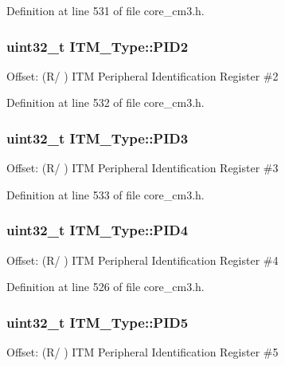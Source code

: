 \-Definition at line 531 of file core\-\_\-cm3.\-h.

\hypertarget{struct_i_t_m___type_ae139d2e588bb382573ffcce3625a88cd}{
\subsubsection[{\-P\-I\-D2}]{ uint32\-\_\-t {\bf \-I\-T\-M\-\_\-\-Type\-::\-P\-I\-D2}}}\label{struct_i_t_m___type_ae139d2e588bb382573ffcce3625a88cd}
\-Offset\-: (\-R/ ) \-I\-T\-M \-Peripheral \-Identification \-Register \#2 

\-Definition at line 532 of file core\-\_\-cm3.\-h.

\hypertarget{struct_i_t_m___type_af006ee26c7e61c9a3712a80ac74a6cf3}{
\subsubsection[{\-P\-I\-D3}]{ uint32\-\_\-t {\bf \-I\-T\-M\-\_\-\-Type\-::\-P\-I\-D3}}}\label{struct_i_t_m___type_af006ee26c7e61c9a3712a80ac74a6cf3}
\-Offset\-: (\-R/ ) \-I\-T\-M \-Peripheral \-Identification \-Register \#3 

\-Definition at line 533 of file core\-\_\-cm3.\-h.

\hypertarget{struct_i_t_m___type_accfc7de00b0eaba0301e8f4553f70512}{
\subsubsection[{\-P\-I\-D4}]{ uint32\-\_\-t {\bf \-I\-T\-M\-\_\-\-Type\-::\-P\-I\-D4}}}\label{struct_i_t_m___type_accfc7de00b0eaba0301e8f4553f70512}
\-Offset\-: (\-R/ ) \-I\-T\-M \-Peripheral \-Identification \-Register \#4 

\-Definition at line 526 of file core\-\_\-cm3.\-h.

\hypertarget{struct_i_t_m___type_a9353055ceb7024e07d59248e54502cb9}{
\subsubsection[{\-P\-I\-D5}]{ uint32\-\_\-t {\bf \-I\-T\-M\-\_\-\-Type\-::\-P\-I\-D5}}}\label{struct_i_t_m___type_a9353055ceb7024e07d59248e54502cb9}
\-Offset\-: (\-R/ ) \-I\-T\-M \-Peripheral \-Identification \-Register \#5 

